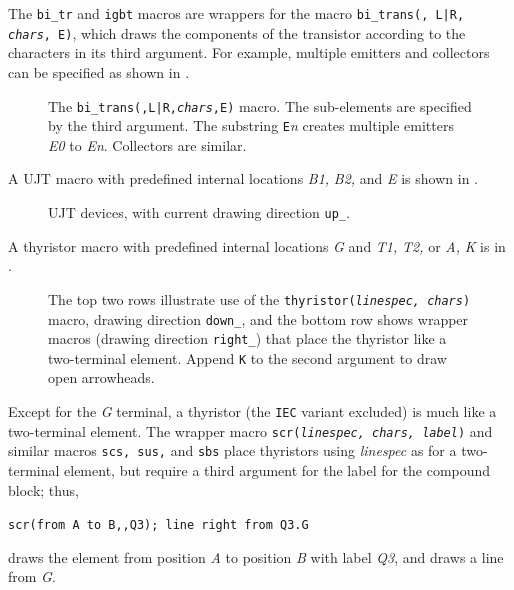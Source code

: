 The {\tt bi\_tr} and {\tt igbt} macros are wrappers for
the macro {\tt bi\_trans(\linespec, L|R, {\sl chars}, E)}, which
draws the components of the transistor according to the characters in its
third argument.  For example, multiple emitters and collectors can be
specified as shown in .
\begin{figure}[h!t]
   
   \caption{The {\tt bi\_trans(\linespec,L|R,{\sl chars},E)} macro.
   The sub-elements are specified by the third argument.  The substring
   {\tt E}{\sl n} creates multiple emitters {\sl E0} to {\sl En}.
   Collectors are similar.}
   \label{bitrans}
   \end{figure}

A UJT macro with predefined internal locations {\sl B1,} {\sl B2,}
and {\sl E} is shown in .
\begin{figure}[h!t]
   
   \caption{UJT devices, with current drawing direction {\tt up\_}. }
   \label{ujt}
   \end{figure}

A thyristor macro with predefined internal locations
 {\sl G} and {\sl T1,} {\sl T2,} or
 {\sl A,} {\sl K} is in .
\begin{figure}[H]
   
   \vspace*{-1ex}
   \caption{The top two rows illustrate use of the
    {\tt thyristor({\sl linespec, chars})} macro,
    drawing direction {\tt down\_}, and the bottom row shows wrapper
    macros (drawing direction {\tt right\_}) that place
    the thyristor like a two-terminal element. Append {\tt K}
    to the second argument to draw open arrowheads.}
   \label{thyristor}
   \end{figure}
Except for the {\sl G} terminal, a thyristor (the {\tt IEC} variant excluded)
is much like a two-terminal element.  The wrapper macro
{\tt scr({\sl linespec, chars, label})} and similar macros
{\tt scs, sus,} and {\tt sbs}
place thyristors using {\sl linespec} as for a two-terminal element,
but require a third argument for the label for the compound block; thus,

{\tt scr(from A to B,{,}Q3); line right from Q3.G}

\noindent
draws the element from position {\sl A} to position {\sl B} with label
{\sl Q3}, and draws a line from {\sl G}.

